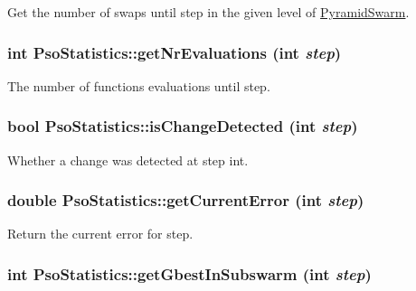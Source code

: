 Get the number of swaps until step in the given level of \hyperlink{classPyramidSwarm}{PyramidSwarm}. 

\hypertarget{classPsoStatistics_381381c8157a927f1c10eb1a0c7160e1}{
\subsubsection{\setlength{\rightskip}{0pt plus 5cm}int PsoStatistics::getNrEvaluations (int {\em step})}}
\label{classPsoStatistics_381381c8157a927f1c10eb1a0c7160e1}


The number of functions evaluations until step. 

\hypertarget{classPsoStatistics_bb314ded9c4e4e3119c0db22946d5064}{
\subsubsection{\setlength{\rightskip}{0pt plus 5cm}bool PsoStatistics::isChangeDetected (int {\em step})}}
\label{classPsoStatistics_bb314ded9c4e4e3119c0db22946d5064}


Whether a change was detected at step int. 

\hypertarget{classPsoStatistics_edd03fdca35f19935b9b503078d694df}{
\subsubsection{\setlength{\rightskip}{0pt plus 5cm}double PsoStatistics::getCurrentError (int {\em step})}}
\label{classPsoStatistics_edd03fdca35f19935b9b503078d694df}


Return the current error for step. 

\hypertarget{classPsoStatistics_8f0897278274f87ddbc510a16f31bc33}{
\subsubsection{\setlength{\rightskip}{0pt plus 5cm}int PsoStatistics::getGbestInSubswarm (int {\em step})}}
\label{classPsoStatistics_8f0897278274f87ddbc510a16f31bc33}


